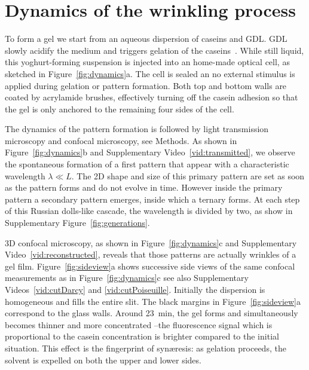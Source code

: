 \documentclass[twocolumn,superscriptaddress,showpacs,preprintnumbers,
amsmath,amssymb,prl]{revtex4-1}
\begin{document}
\section*{Dynamics of the wrinkling process}

To form a gel we start from an aqueous dispersion of caseins and GDL. GDL slowly acidify the medium and triggers gelation of the caseins~\cite{Roefs1986,Bremer1989,Lucey1998,Dickinson2002}. While still liquid, this yoghurt-forming suspension is injected into an home-made optical cell, as sketched in Figure~\ref{fig:dynamics}a. The cell is sealed an no external stimulus is applied during gelation or pattern formation. Both top and bottom walls are coated by acrylamide brushes, effectively turning off the casein adhesion so that the gel is only anchored to the remaining four sides of the cell.

The dynamics of the pattern formation is followed by light transmission microscopy and confocal microscopy, see Methods. As shown in Figure~\ref{fig:dynamics}b and Supplementary Video~\ref{vid:transmitted}, we observe the spontaneous formation of a first pattern that appear with a characteristic wavelength $\lambda\ll L$. The 2D shape and size of this primary pattern are set as soon as the pattern forms and do not evolve in time. However inside the primary pattern a secondary pattern emerges, inside which a ternary forms. At each step of this Russian dolls-like cascade, the wavelength is divided by two, as show in Supplementary Figure~\ref{fig:generations}.

3D confocal microscopy, as shown in Figure~\ref{fig:dynamics}c and Supplementary Video~\ref{vid:reconstructed}, reveals that those patterns are actually wrinkles of a gel film. Figure~\ref{fig:sideview}a shows successive side views of the same confocal measurements as in  Figure~\ref{fig:dynamics}c see also Supplementary Videos~\ref{vid:cutDarcy} and \ref{vid:cutPoiseuille}. Initially the dispersion is homogeneous and fills the entire slit. The black margins in Figure~\ref{fig:sideview}a correspond to the glass walls. Around \SI{23}{\minute}, the gel forms and simultaneously becomes thinner and more concentrated --the fluorescence signal which is proportional to the casein concentration is brighter compared to the initial situation. This effect is the fingerprint of syn\ae{}resis: as gelation proceeds, the solvent is expelled on both the upper and lower sides.
\end{document}
